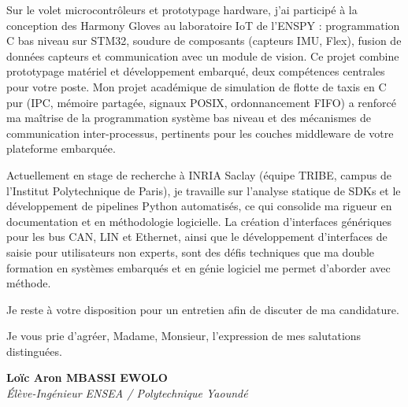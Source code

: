 \documentclass[a4paper,11pt]{article}
\begin{document}
Sur le volet microcontrôleurs et prototypage hardware, j'ai participé à la conception des Harmony Gloves au laboratoire IoT de l'ENSPY : programmation C bas niveau sur STM32, soudure de composants (capteurs IMU, Flex), fusion de données capteurs et communication avec un module de vision. Ce projet combine prototypage matériel et développement embarqué, deux compétences centrales pour votre poste. Mon projet académique de simulation de flotte de taxis en C pur (IPC, mémoire partagée, signaux POSIX, ordonnancement FIFO) a renforcé ma maîtrise de la programmation système bas niveau et des mécanismes de communication inter-processus, pertinents pour les couches middleware de votre plateforme embarquée.

Actuellement en stage de recherche à INRIA Saclay (équipe TRIBE, campus de l'Institut Polytechnique de Paris), je travaille sur l'analyse statique de SDKs et le développement de pipelines Python automatisés, ce qui consolide ma rigueur en documentation et en méthodologie logicielle. La création d'interfaces génériques pour les bus CAN, LIN et Ethernet, ainsi que le développement d'interfaces de saisie pour utilisateurs non experts, sont des défis techniques que ma double formation en systèmes embarqués et en génie logiciel me permet d'aborder avec méthode.

Je reste à votre disposition pour un entretien afin de discuter de ma candidature.

Je vous prie d'agréer, Madame, Monsieur, l'expression de mes salutations distinguées.

\vspace{0.8cm}

\textbf{Loïc Aron MBASSI EWOLO}\\
\textit{Élève-Ingénieur ENSEA / Polytechnique Yaoundé}
\end{document}
